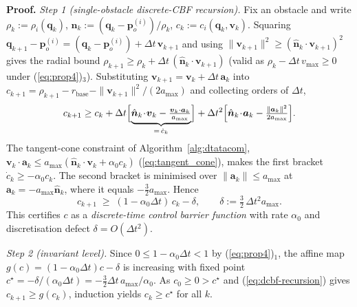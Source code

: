 \documentclass[letterpaper]{article}
\begin{document}
\textbf{Proof.} \emph{Step 1 (single-obstacle discrete-CBF recursion).} Fix an obstacle and write $\rho_k := \rho_i(\boldsymbol{q}_k)$, $\hat{\boldsymbol{n}}_k := (\boldsymbol{q}_k - \boldsymbol{p}_o^{(i)})/\rho_k$, $c_k := c_i(\boldsymbol{q}_k,\boldsymbol{v}_k)$. Squaring $\boldsymbol{q}_{k+1} - \boldsymbol{p}_o^{(i)} = (\boldsymbol{q}_k - \boldsymbol{p}_o^{(i)}) + \Delta t\,\boldsymbol{v}_{k+1}$ and using $\|\boldsymbol{v}_{k+1}\|^2 \ge (\hat{\boldsymbol{n}}_k\!\cdot\!\boldsymbol{v}_{k+1})^2$ gives the radial bound $\rho_{k+1} \ge \rho_k + \Delta t\,(\hat{\boldsymbol{n}}_k\!\cdot\!\boldsymbol{v}_{k+1})$ (valid as $\rho_k - \Delta t\,v_{\max} \ge 0$ under (\ref{eq:prop4})$_3$). Substituting $\boldsymbol{v}_{k+1} = \boldsymbol{v}_k + \Delta t\,\boldsymbol{a}_k$ into $c_{k+1} = \rho_{k+1} - r_\text{base} - \|\boldsymbol{v}_{k+1}\|^2/(2a_{\max})$ and collecting orders of $\Delta t$,
\begin{equation}
c_{k+1} \ge c_k + \Delta t\Bigl[\underbrace{\hat{\boldsymbol{n}}_k\!\cdot\!\boldsymbol{v}_k - \tfrac{\boldsymbol{v}_k\cdot\boldsymbol{a}_k}{a_{\max}}}_{=\,\dot c_k}\Bigr] + \Delta t^2\Bigl[\hat{\boldsymbol{n}}_k\!\cdot\!\boldsymbol{a}_k - \tfrac{\|\boldsymbol{a}_k\|^2}{2a_{\max}}\Bigr].
\notag
\end{equation}
The tangent-cone constraint of Algorithm~\ref{alg:dtatacom}, $\boldsymbol{v}_k\!\cdot\!\boldsymbol{a}_k \le a_{\max}(\hat{\boldsymbol{n}}_k\!\cdot\!\boldsymbol{v}_k + \alpha_0 c_k)$ (\ref{eq:tangent_cone}), makes the first bracket $\dot c_k \ge -\alpha_0 c_k$. The second bracket is minimised over $\|\boldsymbol{a}_k\| \le a_{\max}$ at $\boldsymbol{a}_k = -a_{\max}\hat{\boldsymbol{n}}_k$, where it equals $-\tfrac{3}{2}a_{\max}$. Hence
\begin{equation}
c_{k+1} \;\ge\; (1 - \alpha_0\Delta t)\,c_k - \delta,
\qquad \delta := \tfrac{3}{2}\,\Delta t^2 a_{\max}.
\label{eq:dcbf-recursion}
\end{equation}
This certifies $c$ as a \emph{discrete-time control barrier function} with rate $\alpha_0$ and discretisation defect $\delta = O(\Delta t^2)$.

\emph{Step 2 (invariant level).} Since $0 \le 1 - \alpha_0\Delta t < 1$ by (\ref{eq:prop4})$_1$, the affine map $g(c) = (1-\alpha_0\Delta t)c - \delta$ is increasing with fixed point $c^\star = -\delta/(\alpha_0\Delta t) = -\tfrac{3}{2}\Delta t\,a_{\max}/\alpha_0$. As $c_0 \ge 0 > c^\star$ and (\ref{eq:dcbf-recursion}) gives $c_{k+1} \ge g(c_k)$, induction yields $c_k \ge c^\star$ for all $k$.
\end{document}

